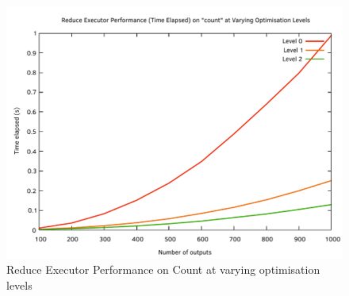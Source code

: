 \begin{figure}[htb]
    \centering
    \includegraphics[width=\textwidth - 60pt]{04_results/images/reduce_count_performance}
    \caption{Reduce Executor Performance on Count at varying optimisation levels}
    \label{fig:reduce_count_performance}
\end{figure}

